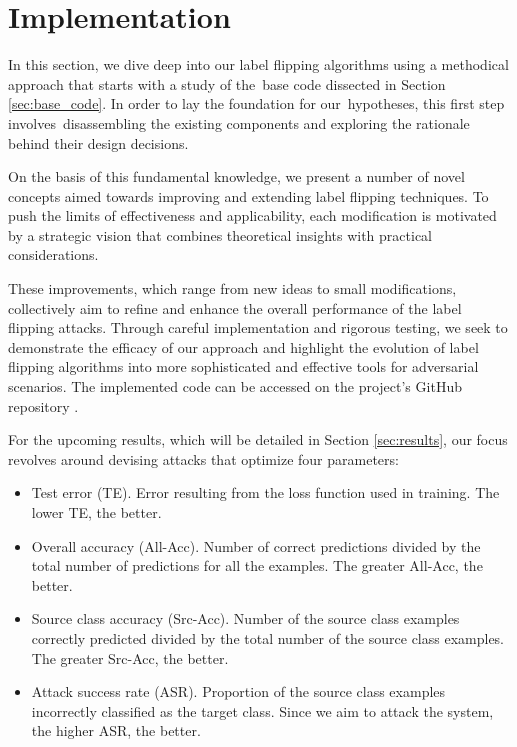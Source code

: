\section{Implementation} \label{sec:implementation}
In this section, we dive deep into our label flipping algorithms using a methodical approach that starts with a study of the base code dissected in Section \ref{sec:base_code}. In order to lay the foundation for our hypotheses, this first step involves disassembling the existing components and exploring the rationale behind their design decisions.

On the basis of this fundamental knowledge, we present a number of novel concepts aimed towards improving and extending label flipping techniques. To push the limits of effectiveness and applicability, each modification is motivated by a strategic vision that combines theoretical insights with practical considerations.

These improvements, which range from new ideas to small modifications, collectively aim to refine and enhance the overall performance of the label flipping attacks. Through careful implementation and rigorous testing, we seek to demonstrate the efficacy of our approach and highlight the evolution of label flipping algorithms into more sophisticated and effective tools for adversarial scenarios. The implemented code can be accessed on the project's GitHub repository \cite{MastersThesisCode}.

For the upcoming results, which will be detailed in Section \ref{sec:results}, our focus revolves around devising attacks that optimize four parameters:
\begin{itemize}
        \item Test error (TE). Error resulting from the loss function used in training. The lower TE, the better.
        \item Overall accuracy (All-Acc). Number of correct predictions divided by the total number of predictions for all the examples. The greater All-Acc, the better.
        \item Source class accuracy (Src-Acc). Number of the source class examples correctly predicted divided by the total number of the source class examples. The greater Src-Acc, the better.
        \item Attack success rate (ASR). Proportion of the source class examples incorrectly classified as the target class. Since we aim to attack the system, the higher ASR, the better.
\end{itemize}

